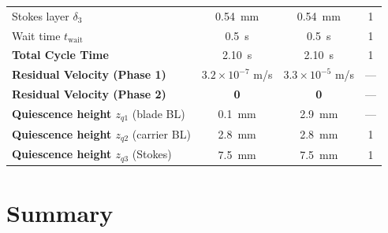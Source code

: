 \documentclass[11pt,a4paper]{article}
\begin{document}
\begin{table}[H]
\begin{tabular}{lccc}
Stokes layer $\delta_3$ & \SI{0.54}{mm} & \SI{0.54}{mm} & 1 \\
Wait time $t_\mathrm{wait}$ & \SI{0.5}{s} & \SI{0.5}{s} & 1 \\
\midrule
\textbf{Total Cycle Time} & \SI{2.10}{s} & \SI{2.10}{s} & 1 \\
\midrule
\textbf{Residual Velocity (Phase 1)} & $3.2 \times 10^{-7}$ m/s & $3.3 \times 10^{-5}$ m/s & --- \\
\textbf{Residual Velocity (Phase 2)} & \textbf{0} & \textbf{0} & --- \\
\textbf{Quiescence height $z_{q1}$} (blade BL) & \SI{0.1}{mm} & \SI{2.9}{mm} & --- \\
\textbf{Quiescence height $z_{q2}$} (carrier BL) & \SI{2.8}{mm} & \SI{2.8}{mm} & 1 \\
\textbf{Quiescence height $z_{q3}$} (Stokes) & \SI{7.5}{mm} & \SI{7.5}{mm} & 1 \\
\bottomrule
\end{tabular}
\end{table}


\section{Summary}
\label{sec:summary}
\end{document}
